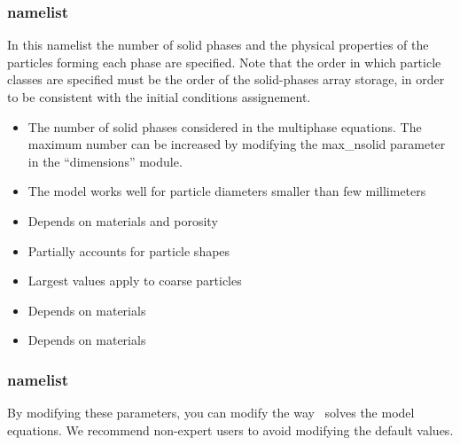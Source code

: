 \subsubsection{ namelist}
In this namelist the number of solid phases and the physical properties of the
particles forming each phase are specified. Note that the order in which 
particle classes are specified must be the order of the solid-phases array 
storage, in order to be consistent with the initial conditions assignement.

\begin{itemize}

\item
{}
{The number of solid phases considered in the multiphase equations.
The maximum number can be increased by modifying the max\_nsolid parameter
in the ``dimensions'' module.}

\item
{}
{The model works well for particle diameters smaller than few millimeters}

\item
{}
{Depends on materials and porosity}

\item
{}
{Partially accounts for particle shapes}

\item
{}
{Largest values apply to coarse particles}

\item
{}
{Depends on materials}

\item
{}
{Depends on materials}

\end{itemize}

\subsubsection{ namelist}
By modifying these parameters, you can modify the way \PDAC\ solves the 
model equations. We recommend non-expert users to avoid modifying the
default values.

